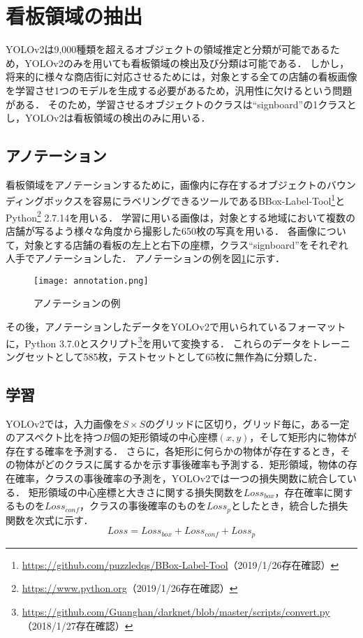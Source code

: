 \section{看板領域の抽出}
  YOLOv2は9,000種類を超えるオブジェクトの領域推定と分類が可能であるため，YOLOv2のみを用いても看板領域の検出及び分類は可能である．
  しかし，将来的に様々な商店街に対応させるためには，対象とする全ての店舗の看板画像を学習させ1つのモデルを生成する必要があるため，汎用性に欠けるという問題がある．
  そのため，学習させるオブジェクトのクラスは``signboard''の1クラスとし，YOLOv2は看板領域の検出のみに用いる．
  \subsection{アノテーション}
    看板領域をアノテーションするために，画像内に存在するオブジェクトのバウンディングボックスを容易にラベリングできるツールであるBBox-Label-Tool\footnote{\url{https://github.com/puzzledqs/BBox-Label-Tool}（2019/1/26存在確認）}とPython\footnote{\url{https://www.python.org}（2019/1/26存在確認）} 2.7.14を用いる．
    学習に用いる画像は，対象とする地域において複数の店舗が写るよう様々な角度から撮影した650枚の写真を用いる．
    各画像について，対象とする店舗の看板の左上と右下の座標，クラス``signboard''をそれぞれ人手でアノテーションした．
    アノテーションの例を図\ref{figure:annotation}に示す．
    \begin{figure}[tb]
      \centerline{\texttt{[image: annotation.png]}}
      \caption{アノテーションの例}
      \label{figure:annotation}
    \end{figure}
    その後，アノテーションしたデータをYOLOv2で用いられているフォーマットに，Python 3.7.0とスクリプト\footnote{\url{https://github.com/Guanghan/darknet/blob/master/scripts/convert.py}（2018/1/27存在確認）}を用いて変換する．
    これらのデータをトレーニングセットとして585枚，テストセットとして65枚に無作為に分類した．
  \subsection{学習}
    YOLOv2では，入力画像を$S \times S$のグリッドに区切り，グリッド毎に，ある一定のアスペクト比を持つ$B$個の矩形領域の中心座標$(x, y)$，そして矩形内に物体が存在する確率を予測する．
    さらに，各矩形に何らかの物体が存在するとき，その物体がどのクラスに属するかを示す事後確率も予測する．矩形領域，物体の存在確率，クラスの事後確率の予測を，YOLOv2では一つの損失関数に統合している．
    矩形領域の中心座標と大きさに関する損失関数を$Loss_{box}$，存在確率に関するものを$Loss_{conf}$，クラスの事後確率のものを$Loss_{p}$としたとき，統合した損失関数を次式に示す．
    \begin{equation}
      Loss = Loss_{box} + Loss_{conf} + Loss_{p}
    \end{equation}

